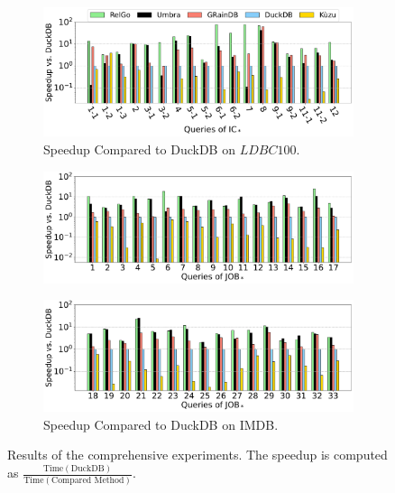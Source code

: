 \begin{figure}[t]
    \centering
    \begin{subfigure}[b]{\linewidth}
        \centering
        \includegraphics[width=\linewidth]{./figures/exp/e2e_sf100.pdf}
        \vspace{-2em}
        \caption{Speedup Compared to DuckDB on $LDBC100$.}
        \label{fig:exp-e2e-sf100}
    \end{subfigure}
    \begin{subfigure}[b]{\linewidth}
        \centering
        \includegraphics[width=\linewidth]{./figures/exp/e2e_job_part1.pdf}
        \vspace*{-2ex}
    \end{subfigure}
    \begin{subfigure}[b]{\linewidth}
        \centering
        \includegraphics[width=\linewidth]{./figures/exp/e2e_job_part2.pdf}
        \vspace{-2em}
        \caption{Speedup Compared to DuckDB on IMDB.}
        \label{fig:exp-e2e-job}
    \end{subfigure}
    \caption{Results of the comprehensive experiments. The speedup is computed as $\frac{\text{Time}(\text{DuckDB})}{\text{Time}(\text{Compared Method})}$. }
    \label{fig:exp-e2e}
    \vspace{-1em}
\end{figure}

